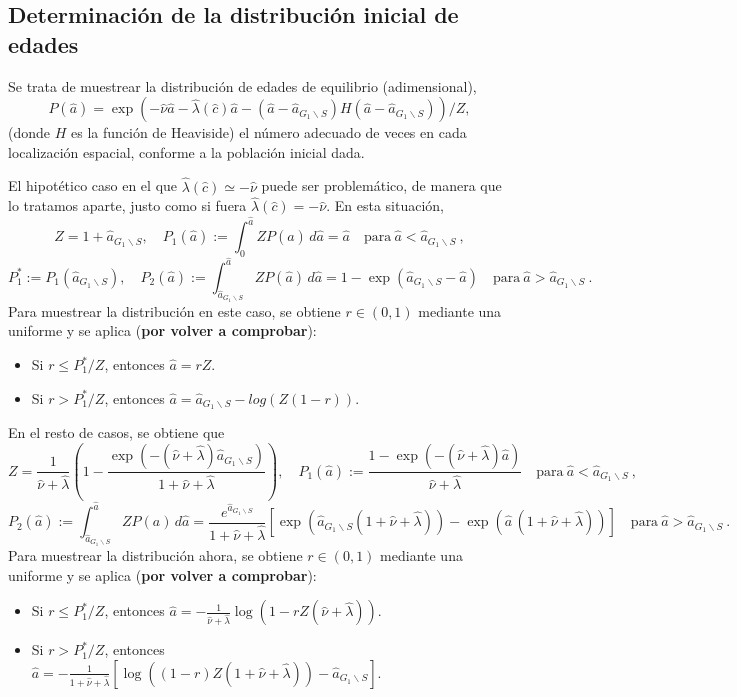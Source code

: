 \documentclass[12pt]{article}
\numberwithin{equation}{section}
\begin{document}
\subsection{Determinaci\'on de la distribuci\'on inicial de edades}
Se trata de muestrear la distribuci\'on de edades de equilibrio (adimensional),
\begin{equation}
\label{eq:ages}
P(\hat a)= \exp (-\hat\nu \hat a - \hat\lambda(\hat c)\hat a - (\hat a-\hat a_{G_1\backslash S})H(\hat a-\hat a_{G_1\backslash S})) /Z,
\end{equation}
(donde $H$ es la funci\'on de Heaviside) el n\'umero adecuado de veces en cada localizaci\'on espacial, conforme a la poblaci\'on inicial dada. 

El hipot\'etico caso en el que $\hat \lambda(\hat c)\simeq -\hat \nu$ puede ser problem\'atico, de manera que lo tratamos aparte, justo como si fuera $\hat\lambda(\hat c)= -\hat \nu$. En esta situaci\'on,
\[
Z=1+\hat a_{G_1\backslash S},\quad P_1(\hat a):=\int_0^{\hat a} Z P(\hat a)\, d\hat a= \hat a \quad \mbox{para}\ \hat a<\hat a_{G_1\backslash S}\:,
\]
%
\[
P_1^*:=P_1(\hat a_{G_1\backslash S}),\quad P_2(\hat a):=\int_{\hat a_{G_1\backslash S}}^{\hat a} ZP(\hat a)\, d\hat a= 1- \exp (\hat a_{G_1\backslash S}-\hat a)\quad \mbox{para}\ \hat a>\hat a_{G_1\backslash S}\:.
\]
Para muestrear la distribuci\'on en este caso, se obtiene $r\in (0,1)$ mediante una uniforme y se aplica ({\bf por volver a comprobar}):
\begin{itemize}
\item Si $r\le P_1^*/Z$, entonces $\hat a=r Z$.
\item Si $r>P_1^*/Z$, entonces $\hat a=\hat a_{G_1\backslash S} -log(Z(1-r))$.
\end{itemize}

En el resto de casos, se obtiene que 
\[
Z=\frac{1}{\hat \nu+\hat \lambda}\left(1-\frac{\exp(-(\hat \nu+\hat \lambda)\hat a_{G_1\backslash S})}{1+\hat \nu+\hat \lambda}\right),\quad P_1(\hat a):= \frac{1-\exp(-(\hat \nu+\hat \lambda)\hat a)}{\hat \nu +\hat \lambda} \quad \mbox{para}\ \hat a<\hat a_{G_1\backslash S}\:,
\]
%
\[
 P_2(\hat a):=\int_{\hat a_{G_1\backslash S}}^{\hat a} ZP(a)\, d\hat a= \frac{e^{\hat a_{G_1\backslash S}}}{1+\hat \nu+\hat \lambda} [\exp(\hat a_{G_1\backslash S} (1+\hat \nu+\hat \lambda))-\exp(\hat a\,(1+\hat \nu+\hat \lambda))]\quad \mbox{para}\ \hat a>\hat a_{G_1\backslash S}\:.
\]
Para muestrear la distribuci\'on ahora, se obtiene $r\in (0,1)$ mediante una uniforme y se aplica ({\bf por volver a comprobar}):
\begin{itemize}
\item Si $r\le P_1^*/Z$, entonces $\hat a=-\frac{1}{\hat \nu+\hat \lambda} \log(1-r Z (\hat \nu+\hat \lambda))$.
\item Si $r>P_1^*/Z$, entonces $\hat a=-\frac{1}{1+\hat \nu+\hat \lambda} [\log((1-r) Z (1+\hat \nu+\hat \lambda))-\hat a_{G_1\backslash S}]$.
\end{itemize}
\end{document}
